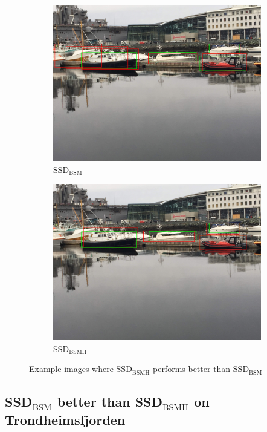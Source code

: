 \begin{figure}[h!]
\begin{subfigure}{.5\textwidth}
  \centering
  \includegraphics[width=0.8\linewidth]{results/case_buildings/ssdtrf/ssd2/3better/IMG_2728.jpg}
  \caption{SSD$_{\text{BSM}}$}
\end{subfigure}%
\begin{subfigure}{.5\textwidth}
  \centering
  \includegraphics[width=.8\linewidth]{results/case_buildings/ssdtrf/ssd3/3better/IMG_2728.jpg}
  \caption{SSD$_{\text{BSMH}}$}
\end{subfigure}
\caption{Example images where SSD$_{\text{BSMH}}$ performs better than SSD$_{\text{BSM}}$}
\label{img:ssd_trf_3better}
\end{figure}

\newpage

\subsection{SSD$_{\text{BSM}}$ better than SSD$_{\text{BSMH}}$ on Trondheimsfjorden}
\label{sec_ssd2_better_trf}

